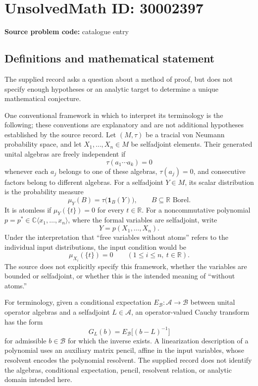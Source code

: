 \documentclass[11pt]{article}
\newcommand{\R}{\mathbb{R}}
\newcommand{\C}{\mathbb{C}}
\begin{document}
\section*{UnsolvedMath ID: 30002397}
\textbf{Source problem code:} catalogue entry
\subsection{Definitions and mathematical statement}
The supplied record asks a question about a method of proof, but does not specify enough hypotheses or an analytic target to determine a unique mathematical conjecture.

One conventional framework in which to interpret its terminology is the following; these conventions are explanatory and are not additional hypotheses established by the source record. Let \((M,\tau)\) be a tracial von Neumann probability space, and let \(X_1,\ldots,X_n\in M\) be selfadjoint elements. Their generated unital algebras are freely independent if
\[
\tau(a_1\cdots a_k)=0
\]
whenever each \(a_j\) belongs to one of these algebras, \(\tau(a_j)=0\), and consecutive factors belong to different algebras. For a selfadjoint \(Y\in M\), its scalar distribution is the probability measure
\[
\mu_Y(B)=\tau\bigl(\mathbf{1}_B(Y)\bigr),\qquad B\subseteq\R\text{ Borel}.
\]
It is atomless if \(\mu_Y(\{t\})=0\) for every \(t\in\R\). For a noncommutative polynomial \(p=p^*\in\C\langle x_1,\ldots,x_n\rangle\), where the formal variables are selfadjoint, write
\[
Y=p(X_1,\ldots,X_n).
\]
Under the interpretation that ``free variables without atoms'' refers to the individual input distributions, the input condition would be
\[
\mu_{X_i}(\{t\})=0\qquad(1\leq i\leq n,\ t\in\R).
\]
The source does not explicitly specify this framework, whether the variables are bounded or selfadjoint, or whether this is the intended meaning of ``without atoms.''

For terminology, given a conditional expectation \(E_{\mathcal B}:\mathcal A\to\mathcal B\) between unital operator algebras and a selfadjoint \(L\in\mathcal A\), an operator-valued Cauchy transform has the form
\[
G_L(b)=E_{\mathcal B}\bigl[(b-L)^{-1}\bigr]
\]
for admissible \(b\in\mathcal B\) for which the inverse exists. A linearization description of a polynomial uses an auxiliary matrix pencil, affine in the input variables, whose resolvent encodes the polynomial resolvent. The supplied record does not identify the algebras, conditional expectation, pencil, resolvent relation, or analytic domain intended here.
\end{document}
